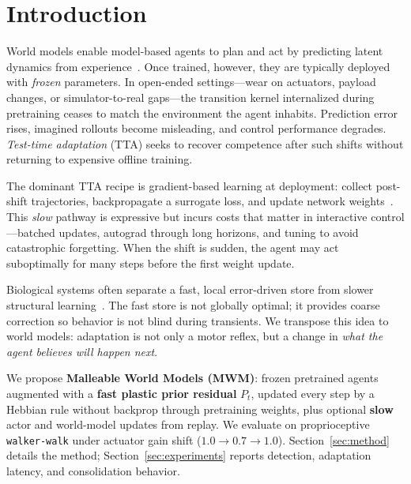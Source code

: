 % 

\section{Introduction}
\label{sec:introduction}

World models enable model-based agents to plan and act by predicting latent dynamics from experience~\cite{hafner2023mastering,hafner2020dream}.
Once trained, however, they are typically deployed with \emph{frozen} parameters.
In open-ended settings---wear on actuators, payload changes, or simulator-to-real gaps---the transition kernel internalized during pretraining ceases to match the environment the agent inhabits.
Prediction error rises, imagined rollouts become misleading, and control performance degrades.
\emph{Test-time adaptation} (TTA) seeks to recover competence after such shifts without returning to expensive offline training.

The dominant TTA recipe is gradient-based learning at deployment: collect post-shift trajectories, backpropagate a surrogate loss, and update network weights~\cite{nagabandi2018learning,zintgraf2021fast}.
This \emph{slow} pathway is expressive but incurs costs that matter in interactive control---batched updates, autograd through long horizons, and tuning to avoid catastrophic forgetting.
When the shift is sudden, the agent may act suboptimally for many steps before the first weight update.

Biological systems often separate a fast, local error-driven store from slower structural learning~\cite{mcclelland1995complementary}.
The fast store is not globally optimal; it provides coarse correction so behavior is not blind during transients.
We transpose this idea to world models: adaptation is not only a motor reflex, but a change in \emph{what the agent believes will happen next}.

We propose \textbf{Malleable World Models (MWM)}: frozen pretrained agents augmented with a \textbf{fast plastic prior residual} $P_t$, updated every step by a Hebbian rule without backprop through pretraining weights, plus optional \textbf{slow} actor and world-model updates from replay.
We evaluate on proprioceptive \texttt{walker-walk} under actuator gain shift ($1.0 \rightarrow 0.7 \rightarrow 1.0$).
Section~\ref{sec:method} details the method; Section~\ref{sec:experiments} reports detection, adaptation latency, and consolidation behavior.

